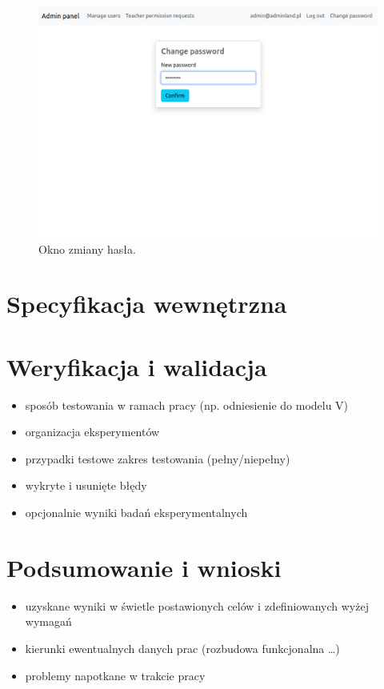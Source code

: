 \documentclass[a4paper,twoside,12pt]{book}
\begin{document}
\begin{figure}[]
\centering
\includegraphics[width=\textwidth]{adminpanel/changepwd}
\caption{Okno zmiany hasła.}
\label{fig:changepwd}
\end{figure}

\chapter{Specyfikacja wewnętrzna}
\label{ch:05}



\chapter{Weryfikacja i walidacja}
\label{ch:06}
\begin{itemize}
\item sposób testowania w ramach pracy (np. odniesienie do modelu V)
\item organizacja eksperymentów
\item przypadki testowe zakres testowania (pełny/niepełny)
\item wykryte i usunięte błędy
\item opcjonalnie wyniki badań eksperymentalnych
\end{itemize}



\chapter{Podsumowanie i wnioski}
\begin{itemize}
\item uzyskane wyniki w świetle postawionych celów i zdefiniowanych wyżej wymagań
\item kierunki ewentualnych danych prac (rozbudowa funkcjonalna …)
\item problemy napotkane w trakcie pracy
\end{itemize}
\end{document}
